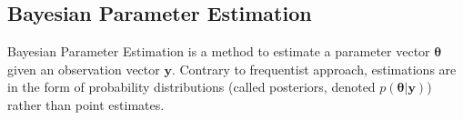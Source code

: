\documentclass[11pt]{article}
\begin{document}

\subsection{Bayesian Parameter Estimation}

Bayesian Parameter Estimation is a method to estimate a parameter vector $\boldsymbol{\theta}$ given an observation vector $\boldsymbol{y}$. Contrary to frequentist approach, estimations are in the form of probability distributions (called posteriors, denoted $p(\boldsymbol{\theta}|\boldsymbol{y})$) rather than point estimates. 
\end{document}
